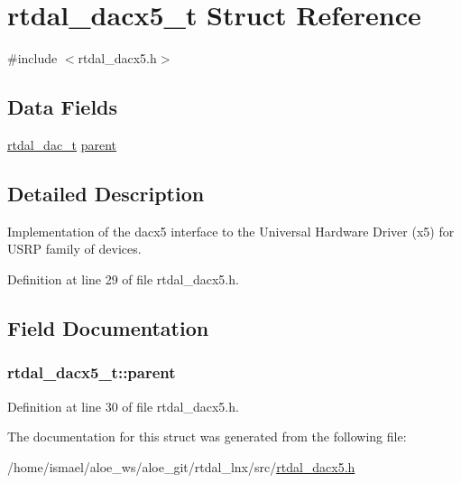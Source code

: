 \hypertarget{structrtdal__dacx5__t}{\section{rtdal\-\_\-dacx5\-\_\-t Struct Reference}
\label{structrtdal__dacx5__t}
}


{\ttfamily \#include $<$rtdal\-\_\-dacx5.\-h$>$}

\subsection*{Data Fields}
\begin{DoxyCompactItemize}
\item 
\hyperlink{structrtdal__dac__t}{rtdal\-\_\-dac\-\_\-t} \hyperlink{structrtdal__dacx5__t_ae6fa4c012185aa153ef2898fbdcfe3ee}{parent}
\end{DoxyCompactItemize}


\subsection{Detailed Description}
Implementation of the dacx5 interface to the Universal Hardware Driver (x5) for U\-S\-R\-P family of devices. 

Definition at line 29 of file rtdal\-\_\-dacx5.\-h.



\subsection{Field Documentation}
\hypertarget{structrtdal__dacx5__t_ae6fa4c012185aa153ef2898fbdcfe3ee}{
\subsubsection[{parent}]{ rtdal\-\_\-dacx5\-\_\-t\-::parent}}\label{structrtdal__dacx5__t_ae6fa4c012185aa153ef2898fbdcfe3ee}


Definition at line 30 of file rtdal\-\_\-dacx5.\-h.



The documentation for this struct was generated from the following file\-:\begin{DoxyCompactItemize}
\item 
/home/ismael/aloe\-\_\-ws/aloe\-\_\-git/rtdal\-\_\-lnx/src/\hyperlink{rtdal__dacx5_8h}{rtdal\-\_\-dacx5.\-h}\end{DoxyCompactItemize}
